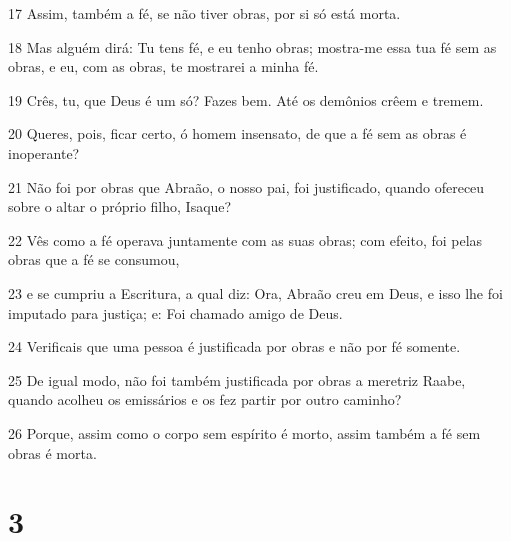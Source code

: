 \par 17 Assim, também a fé, se não tiver obras, por si só está morta.
\par 18 Mas alguém dirá: Tu tens fé, e eu tenho obras; mostra-me essa tua fé sem as obras, e eu, com as obras, te mostrarei a minha fé.
\par 19 Crês, tu, que Deus é um só? Fazes bem. Até os demônios crêem e tremem.
\par 20 Queres, pois, ficar certo, ó homem insensato, de que a fé sem as obras é inoperante?
\par 21 Não foi por obras que Abraão, o nosso pai, foi justificado, quando ofereceu sobre o altar o próprio filho, Isaque?
\par 22 Vês como a fé operava juntamente com as suas obras; com efeito, foi pelas obras que a fé se consumou,
\par 23 e se cumpriu a Escritura, a qual diz: Ora, Abraão creu em Deus, e isso lhe foi imputado para justiça; e: Foi chamado amigo de Deus.
\par 24 Verificais que uma pessoa é justificada por obras e não por fé somente.
\par 25 De igual modo, não foi também justificada por obras a meretriz Raabe, quando acolheu os emissários e os fez partir por outro caminho?
\par 26 Porque, assim como o corpo sem espírito é morto, assim também a fé sem obras é morta.

\chapter{3}


